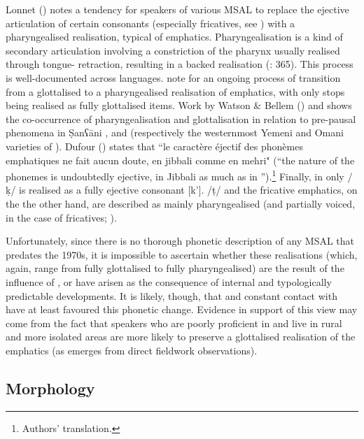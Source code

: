 \documentclass[output=paper]{langsci/langscibook}
\begin{document}
Lonnet (\citeyear[299]{Lonnet2011}) notes a tendency for speakers of various MSAL to replace the ejective articulation of certain consonants (especially fricatives, see \citealt{RidouaneGendrot2017}) with a pharyngealised realisation, typical of  emphatics. Pharyngealisation is a kind of secondary articulation involving a constriction of the pharynx usually realised through tongue- retraction, resulting in a backed realisation (\citealt{LadefogedMaddieson1996}: 365). This process is well-documented across  languages. \citet{NaumkinPorkhomovsky1981} note for  an ongoing process of transition from a glottalised to a pharyngealised realisation of emphatics, with only stops being realised as fully glottalised items. Work by Watson \& Bellem (\citeyear{WatsonBellem2010,WatsonBellem2011}) and \citet{WatsonHeselwood2016} shows the co-occurrence of pharyngealisation and glottalisation in relation to pre-pausal phenomena in \d{S}anʕāni ,  and  (respectively the westernmost {Yemeni} and Omani varieties of ). Dufour (\citeyear[22]{Dufour2016}) states that ``le caractère éjectif des phonèmes emphatiques ne fait aucun doute, en jibbali comme en mehri" (“the nature of the  phonemes is undoubtedly ejective, in Jibbali as much as in ”).\footnote{Authors' translation.} Finally, in  only /ḳ/ is realised as a fully ejective consonant [k’]. /ṭ/ and the fricative emphatics, on the the other hand, are described as mainly pharyngealised (and partially voiced, in the case of fricatives; \citealt{Gasparini2017}).

Unfortunately, since there is no thorough phonetic description of any MSAL that predates the 1970s, it is impossible to ascertain whether these realisations (which, again, range from fully glottalised to fully pharyngealised) are the result of the influence of , or have arisen as the consequence of internal and typologically predictable developments. It is likely, though, that  and constant contact with  have at least favoured this phonetic change. Evidence in support of this view may come from the fact that speakers who are poorly proficient in  and live in rural and more isolated areas are more likely to preserve a glottalised realisation of the emphatics (as emerges from direct fieldwork observations).


 
 \subsection{Morphology} 
\end{document}
